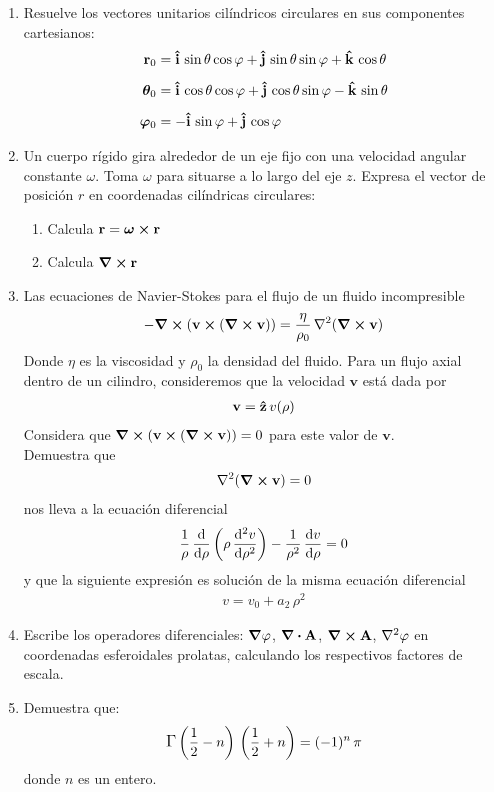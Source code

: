 \begin{enumerate}
\item Resuelve los vectores unitarios cilíndricos circulares en sus componentes cartesianos:
\begin{align*}
\vb{r}_{0} &= \vu{i} \, \sin \theta \cos \varphi + \vu{j} \, \sin \theta \sin \varphi + \vu{k} \, \cos \theta \\[0.5em]
\bm{\theta}_{0} &= \vu{i} \, \cos \theta \cos \varphi + \vu{j} \, \cos \theta \sin \varphi - \vu{k} \, \sin \theta \\[0.5em]
\bm{\varphi}_{0} &= - \vu{i} \, \sin \varphi + \vu{j} \, \cos \varphi
\end{align*}
\item Un cuerpo rígido gira alrededor de un eje fijo con una velocidad angular constante $\omega$. Toma $\omega$ para situarse a lo largo del eje $z$. Expresa el vector de posición $r$ en coordenadas cilíndricas circulares:
\begin{enumerate}
\item Calcula $\vb{r} = \bm{\omega} \cp \vb{r}$
\item Calcula $\curl{\vb{r}}$
\end{enumerate}
\item Las ecuaciones de Navier-Stokes para el flujo de un fluido incompresible
\begin{align*}
- \curl{( \mathbf{v} \cp (\curl{\vb{v}}))} =  \dfrac{\eta}{\rho_{0}} \, \laplacian{(\curl{\vb{v}})}
\end{align*}
Donde $\eta$ es la viscosidad y $\rho_{0}$ la densidad del fluido. Para un flujo axial dentro de un cilindro, consideremos que la velocidad $\mathbf{v}$ está dada por
\begin{align*}
\mathbf{v} =  \vu{z} \, v (\rho)
\end{align*}
Considera que $\curl{( \mathbf{v} \cp (\curl{\vb{v}}))} = 0$ 
para este valor de $\mathbf{v}$.
\\
Demuestra que
\begin{align*}
\laplacian{( \curl{\vb{v}} )} = 0
\end{align*}
nos lleva a la ecuación diferencial
\begin{align*}
\dfrac{1}{\rho} \, \dv{\rho} \left( \rho \, \dv[2]{v}{\rho} \right) -  \dfrac{1}{\rho^{2}} \, \dv{v}{\rho} = 0
\end{align*}
y que la siguiente expresión es solución de la misma ecuación diferencial
\begin{align*}
v = v_{0} + a_{2} \, \rho^{2}
\end{align*}
\item Escribe los operadores diferenciales: $\grad{\varphi}$, $\div{\vb{A}}$, $\curl{\vb{A}}$, $\laplacian{\varphi}$ en coordenadas esferoidales prolatas, calculando los respectivos factores de escala.
\item Demuestra que:
\begin{align*}
\mathlarger{\Gamma} \left( \dfrac{1}{2} - n \right) \, \left( \dfrac{1}{2} + n \right) = (-1)^{n} \, \pi
\end{align*}
donde $n$ es un entero.
\end{enumerate}
